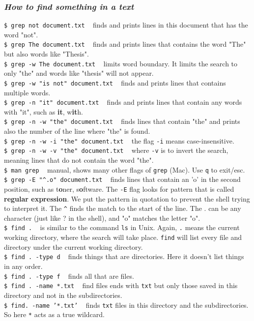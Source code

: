 \documentclass{article}
\begin{document}
\subsubsection{\small\textsl{How to find something in a text }}
\texttt{\$ grep not document.txt} ~ finds and prints lines in this document that has the word "not".\\
\texttt{\$ grep The document.txt} ~ finds and prints lines that contains the word "The" but also words like "Thesis".\\
\texttt{\$ grep -w The document.txt} ~ limits word boundary. It limits the search to only "the" and words like "thesis" will not appear.\\ 
\texttt{\$ grep -w "is not" document.txt} ~ finds and prints lines that contains multiple words. \\
\texttt{\$ grep -n "it" document.txt} ~ finds and prints lines that contain any words with "it", such as \textbf{it}, w\textbf{it}h.\\
\texttt{\$ grep -n -w "the" document.txt}  ~ finds lines that contain "the" and prints also the number of the line where "the" is found.\\
\texttt{\$ grep -n -w -i "the" document.txt} ~ the flag \texttt{-i} means case-insensitive.\\
\texttt{\$ grep -n -w -v "the" document.txt} ~ where \texttt{-v} is to invert the search, meaning lines that do not contain the word "the".\\
\texttt{\$ man grep} ~ manual, shows many other flags of \texttt{grep} (Mac). Use \texttt{q} to exit/esc.\\ 
\texttt{\$ grep -E "\textasciicircum.o" document.txt} ~ finds lines that contain an 'o' in the second position, such as t\textbf{o}ner, s\textbf{o}ftware. The \texttt{-E} flag looks for pattern that is called \textbf{regular expression}. We put the pattern in quotation to prevent the shell trying to interpret it. The \texttt{\textasciicircum} finds the match to the start of the line. The . can be any character (just like ? in the shell), and "o" matches the letter "o". \\
\texttt{\$ find .} ~ is similar to the command \texttt{ls} in Unix. Again, \texttt{.} means the current working directory, where the search will take place. \texttt{find} will list every file and directory under the current working directory.\\
\texttt{\$ find . -type d} ~ finds things that are directories. Here it doesn't list things in any order.\\
\texttt{\$ find . -type f} ~ finds all that are files.\\
\texttt{\$ find . -name *.txt} ~ find files ends with \texttt{txt} but only those saved in this directory and not in the subdirectories. \\
\texttt{\$ find. -name '*.txt'} ~ finds \texttt{txt} files in this directory and the subdirectories. So here \texttt{*} acts as a true wildcard.\\
 
\end{document}

